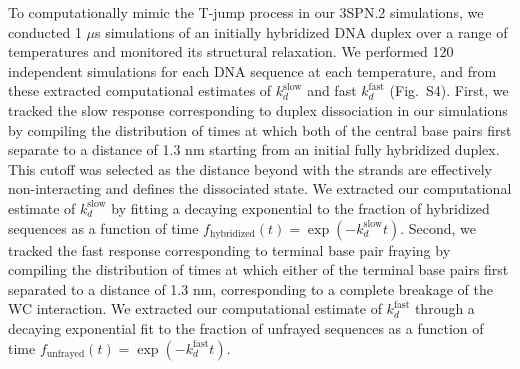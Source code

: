 \documentclass[journal=jpcbfk,manuscript=article]{achemso}
\newcommand*{\blauw}[1]{{#1}}
\begin{document}
To computationally mimic the T-jump process in our 3SPN.2 simulations, we conducted 1 $\mu$s simulations of an initially hybridized DNA duplex over a range of temperatures and monitored its structural relaxation. We performed 120 independent simulations for each DNA sequence at each temperature, and from these extracted computational estimates of $k_d^\mathrm{slow}$ and fast $k_d^\mathrm{fast}$ (\blauw{Fig.~S4}). First, we tracked the slow response corresponding to duplex dissociation in our simulations by compiling the distribution of times at which both of the central base pairs first separate to a distance of 1.3 nm starting from an initial fully hybridized duplex. This cutoff was selected as the distance beyond with the strands are effectively non-interacting and defines the dissociated state. We extracted our computational estimate of $k_d^\mathrm{slow}$ by fitting a decaying exponential to the fraction of hybridized sequences as a function of time $f_\mathrm{hybridized}(t) = \exp(-k_d^\mathrm{slow}t)$. Second, we tracked the fast response corresponding to terminal base pair fraying by compiling the distribution of times at which either of the terminal base pairs first separated to a distance of 1.3 nm, corresponding to a complete breakage of the WC interaction. We extracted our computational estimate of $k_d^\mathrm{fast}$ through a decaying exponential fit to the fraction of unfrayed sequences as a function of time $f_\mathrm{unfrayed}(t) = \exp(-k_d^\mathrm{fast}t)$. 
\end{document}
